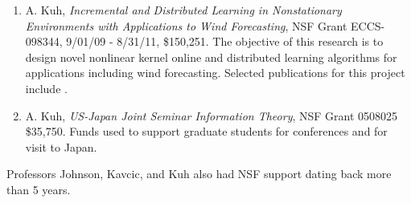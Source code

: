 \begin{enumerate}
\item A. Kuh, {\em Incremental and Distributed Learning in Nonstationary
    Environments with Applications to Wind Forecasting}, NSF Grant ECCS-098344,
  9/01/09 - 8/31/11, \$150,251.  The objective of this research is to
  design novel nonlinear kernel online and distributed learning algorithms
  for applications including wind forecasting.  Selected publications for
  this project include \cite{kuhetal-10icgc,kowahl-kuh-10ijcnn}.

\item A. Kuh, {\em US-Japan Joint Seminar Information Theory}, NSF Grant 0508025
  \$35,750.  Funds used to support graduate students for conferences and
  for visit to Japan.
\end{enumerate}

Professors Johnson, Kavcic, and Kuh also had NSF support dating back more than 5 years.


